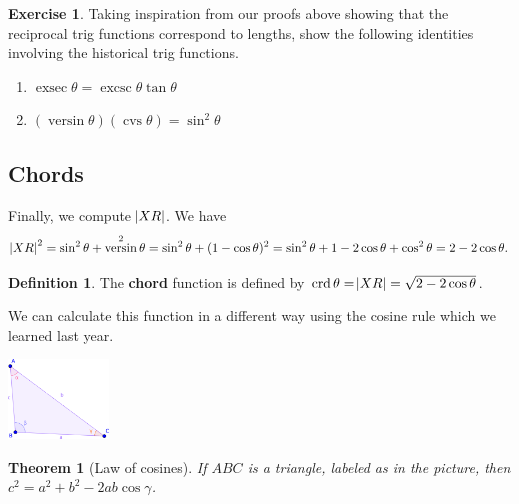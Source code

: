 \documentclass[a4paper,leqno]{article}
\numberwithin{equation}{section}
\newtheorem{thm}[equation]{Theorem}
\theoremstyle{definition}
\newtheorem{defn}[equation]{Definition}
\newtheorem{exercise}[equation]{Exercise}
\theoremstyle{remark}
\newcommand{\df}[1]{\textbf{#1}}
\DeclareMathOperator{\versin}{versin}
\DeclareMathOperator{\cvs}{cvs}
\DeclareMathOperator{\exsec}{exsec}
\DeclareMathOperator{\excsc}{excsc}
\DeclareMathOperator{\crd}{crd}
\begin{document}
\begin{exercise}
  Taking inspiration from our proofs above showing that the reciprocal trig functions correspond
  to lengths, show the following identities involving the historical trig functions.
  \begin{enumerate}
    \item $ \exsec \theta = \excsc \theta \tan \theta $
    \item $ (\versin \theta)(\cvs \theta) = \sin^2 \theta $
  \end{enumerate}
\end{exercise}

\subsection{Chords}
Finally, we compute $ \abs{XR} $. We have
\begin{displaymath}
  \abs{XR}^2 = \sin^2 \theta + \versin^2 \theta = \sin^2 \theta + (1 - \cos \theta)^2 = \sin^2 \theta + 1 - 2\cos \theta + \cos^2 \theta = 2 - 2\cos \theta.
\end{displaymath}

\begin{defn}
  The \df{chord} function is defined by $ \crd \theta = \abs{XR} = \sqrt{2 - 2\cos \theta} $.
\end{defn}

We can calculate this function in a different way using the cosine rule which we learned last year.

\begin{center}
  \includegraphics[width=0.2\textwidth]{trisines}
\end{center}

\begin{thm}[Law of cosines]
  If $ ABC $ is a triangle, labeled as in the picture, then $ c^2 = a^2 + b^2 - 2ab \cos \gamma $.
\end{thm}
\end{document}

